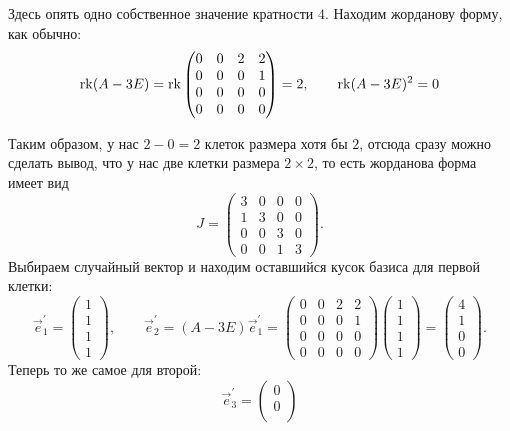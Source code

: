 \begin{solution}
	Здесь опять одно собственное значение кратности $4$. Находим жорданову форму, как обычно:
	\begin{gather*}
		\operatorname{rk}(A - 3E) = \operatorname{rk}
		\begin{pmatrix}
			0 & 0 & 2 & 2\\
			0 & 0 & 0 & 1\\
			0 & 0 & 0 & 0\\
			0 & 0 & 0 & 0
		\end{pmatrix} = 2,\qquad \operatorname{rk}(A - 3E)^2 = 0
	\end{gather*}

	Таким образом, у нас $2 - 0 = 2$ клеток размера хотя бы $2$, отсюда сразу можно сделать вывод, что у нас две клетки размера $2 \times 2$, то есть жорданова форма имеет вид
	\[
		J =
		\begin{pmatrix}
			3 & 0 & 0 & 0\\
			1 & 3 & 0 & 0\\
			0 & 0 & 3 & 0\\
			0 & 0 & 1 & 3
		\end{pmatrix}.
	\]
	Выбираем случайный вектор и находим оставшийся кусок базиса для первой клетки:
	\[
		\vec{e}^\prime_1 =
		\begin{pmatrix}
			1\\
			1\\
			1\\
			1
		\end{pmatrix},\qquad
		\vec{e}^\prime_2 = (A - 3E)\vec{e}^\prime_1 =
		\begin{pmatrix}
			0 & 0 & 2 & 2\\
			0 & 0 & 0 & 1\\
			0 & 0 & 0 & 0\\
			0 & 0 & 0 & 0
		\end{pmatrix}
		\begin{pmatrix}
			1\\
			1\\
			1\\
			1
		\end{pmatrix} =
		\begin{pmatrix}
			4\\
			1\\
			0\\
			0
		\end{pmatrix}.
	\]
	Теперь то же самое для второй:
	\[
		\vec{e}^\prime_3 =
		\begin{pmatrix}
			0\\
			0\\

\end{pmatrix}\]
\end{solution}
